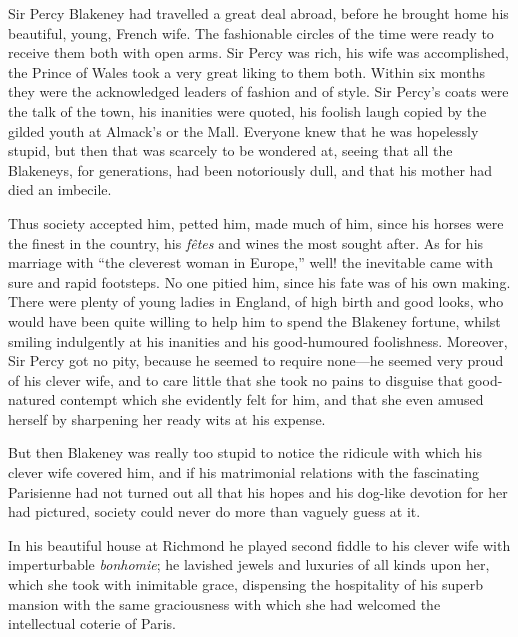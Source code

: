 Sir Percy Blakeney had travelled a great deal abroad, before he brought home his beautiful, young, French wife. The fashionable circles of the time were ready to receive them both with open arms. Sir Percy was rich, his wife was accomplished, the Prince of Wales took a very great liking to them both. Within six months they were the acknowledged leaders of fashion and of style. Sir Percy's coats were the talk of the town, his inanities were quoted, his foolish laugh copied by the gilded youth at Almack's or the Mall. Everyone knew that he was hopelessly stupid, but then that was scarcely to be wondered at, seeing that all the Blakeneys, for generations, had been notoriously dull, and that his mother had died an imbecile.

Thus society accepted him, petted him, made much of him, since his horses were the finest in the country, his \textit{fêtes} and wines the most sought after. As for his marriage with \enquote{the cleverest woman in Europe,} well! the inevitable came with sure and rapid footsteps. No one pitied him, since his fate was of his own making. There were plenty of young ladies in England, of high birth and good looks, who would have been quite willing to help him to spend the Blakeney fortune, whilst smiling indulgently at his inanities and his good-humoured foolishness. Moreover, Sir Percy got no pity, because he seemed to require none---he seemed very proud of his clever wife, and to care little that she took no pains to disguise that good-natured contempt which she evidently felt for him, and that she even amused herself by sharpening her ready wits at his expense.

But then Blakeney was really too stupid to notice the ridicule with which his clever wife covered him, and if his matrimonial relations with the fascinating Parisienne had not turned out all that his hopes and his dog-like devotion for her had pictured, society could never do more than vaguely guess at it.

In his beautiful house at Richmond he played second fiddle to his clever wife with imperturbable \textit{bonhomie}; he lavished jewels and luxuries of all kinds upon her, which she took with inimitable grace, dispensing the hospitality of his superb mansion with the same graciousness with which she had welcomed the intellectual coterie of Paris.

